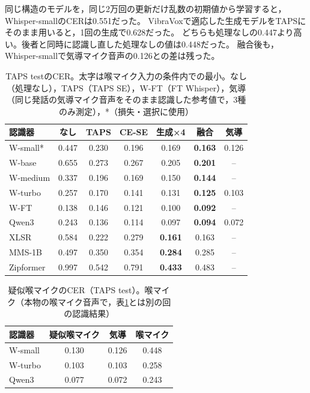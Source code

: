 \documentclass[xelatex,ja=standard,a4paper,twocolumn,10pt]{bxjsarticle}
\begin{document}
同じ構造のモデルを，同じ2万回の更新だけ乱数の初期値から学習すると，Whisper-smallのCERは0.551だった。
VibraVoxで適応した生成モデルをTAPSにそのまま用いると，1回の生成で0.628だった。
どちらも処理なしの0.447より高い。後者と同時に認識し直した処理なしの値は0.448だった。
融合後も，Whisper-smallで気導マイク音声の0.126との差は残った。

\begin{table}[t]
  \centering
  \caption{TAPS testのCER。太字は喉マイク入力の条件内での最小。なし（処理なし），TAPS（TAPS SE），W-FT（FT Whisper），気導（同じ発話の気導マイク音声をそのまま認識した参考値で，3種のみ測定），*（損失・選択に使用）}
  \label{tab:main}
  \footnotesize
  \setlength{\tabcolsep}{3.0pt}
  \begin{tabular}{lcccccc}
    \toprule
    認識器 & なし & TAPS & CE-SE & 生成×4 & 融合 & 気導 \\
    \midrule
    W-small* & 0.447 & 0.230 & 0.196 & 0.169 & \textbf{0.163} & 0.126 \\
    W-base & 0.655 & 0.273 & 0.267 & 0.205 & \textbf{0.201} & -- \\
    W-medium & 0.337 & 0.196 & 0.169 & 0.150 & \textbf{0.144} & -- \\
    W-turbo & 0.257 & 0.170 & 0.141 & 0.131 & \textbf{0.125} & 0.103 \\
    W-FT & 0.138 & 0.146 & 0.121 & 0.100 & \textbf{0.092} & -- \\
    Qwen3 & 0.243 & 0.136 & 0.114 & 0.097 & \textbf{0.094} & 0.072 \\
    \midrule
    XLSR & 0.584 & 0.222 & 0.279 & \textbf{0.161} & 0.163 & -- \\
    MMS-1B & 0.497 & 0.350 & 0.354 & \textbf{0.284} & 0.285 & -- \\
    Zipformer & 0.997 & 0.542 & 0.791 & \textbf{0.433} & 0.483 & -- \\
    \bottomrule
  \end{tabular}
\end{table}

\begin{table}[t]
  \centering
  \caption{疑似喉マイクのCER（TAPS test）。喉マイク（本物の喉マイク音声で，表\ref{tab:main}とは別の回の認識結果）}
  \label{tab:pseudo}
  \footnotesize
  \setlength{\tabcolsep}{4.0pt}
  \begin{tabular}{lccc}
    \toprule
    認識器 & 疑似喉マイク & 気導 & 喉マイク \\
    \midrule
    W-small & 0.130 & 0.126 & 0.448 \\
    W-turbo & 0.103 & 0.103 & 0.258 \\
    Qwen3 & 0.077 & 0.072 & 0.243 \\
    \bottomrule
  \end{tabular}
\end{table}
\end{document}
